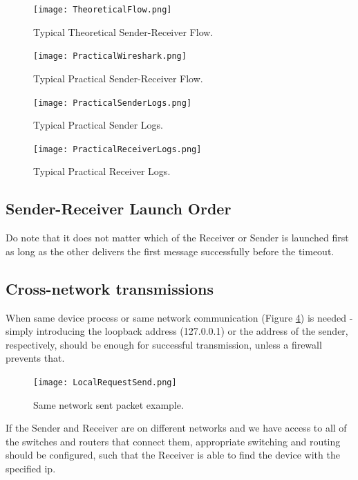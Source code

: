\documentclass[12pt]{article}
\begin{document}
\begin{figure}[!htb]
	\centering
	\texttt{[image: TheoreticalFlow.png]}
	\caption{Typical Theoretical Sender-Receiver Flow.}\label{fig:fig2}
\end{figure}

\begin{figure}[!htb]
	\centering
	\texttt{[image: PracticalWireshark.png]}
		\caption{Typical Practical Sender-Receiver Flow.}\label{fig:fig3}
\end{figure}

\begin{figure}[!htb]
	\begin{minipage}{0.48\textwidth}
		\centering
		\texttt{[image: PracticalSenderLogs.png]}
		\caption{Typical Practical Sender Logs.}\label{fig:fig4}
	\end{minipage}\hfill
	\begin{minipage}{0.48\textwidth}
		\centering
		\texttt{[image: PracticalReceiverLogs.png]}
		\caption{Typical Practical Receiver Logs.}\label{fig:fig5}
	\end{minipage}\hfill
\end{figure}

\subsection{Sender-Receiver Launch Order}

Do note that it does not matter which of the Receiver or Sender is launched first as long as the other delivers the first message successfully before the timeout.

\subsection{Cross-network transmissions}

When same device process or same network communication (Figure \ref{fig:fig6}) is needed - simply introducing the loopback address (127.0.0.1) or the address of the sender, respectively, should be enough for successful transmission, unless a firewall prevents that.

\begin{figure}[!htb]
	\centering
	\texttt{[image: LocalRequestSend.png]}
	\caption{Same network sent packet example.}\label{fig:fig6}
\end{figure}

If the Sender and Receiver are on different networks and we have access to all of the switches and routers that connect them, appropriate switching and routing should be configured, such that the Receiver is able to find the device with the specified ip.
\end{document}

